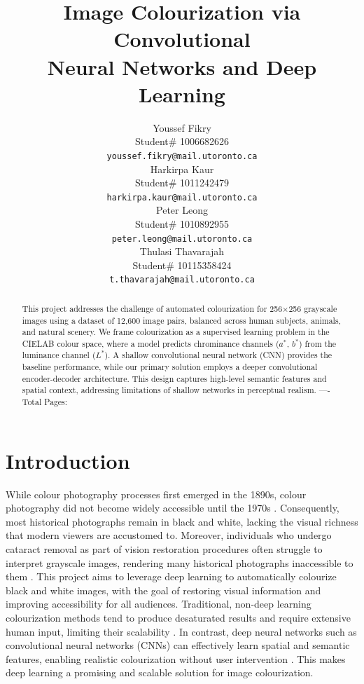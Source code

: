 \documentclass{article} %
\title{Image Colourization via Convolutional \\
Neural Networks and Deep Learning}
\author{Youssef Fikry  \\
Student\# 1006682626\\
\texttt{youssef.fikry@mail.utoronto.ca} \\
\And Harkirpa Kaur  \\
Student\# 1011242479 \\
\texttt{harkirpa.kaur@mail.utoronto.ca} \\
\AND
Peter Leong \\
Student\# 1010892955 \\
\texttt{peter.leong@mail.utoronto.ca} \\
\And
Thulasi Thavarajah \\
Student\# 10115358424 \\
\texttt{t.thavarajah@mail.utoronto.ca} \\
\AND
}
\begin{document}
\maketitle

\begin{abstract}
This project addresses the challenge of automated colourization for 256$\times$256 grayscale images using a dataset of 12,600 image pairs, balanced across human subjects, 
animals, and natural scenery. We frame colourization as a supervised learning problem in the CIELAB colour space, where a model predicts chrominance channels ($a^*$, $b^*$) 
from the luminance channel ($L^*$). A shallow convolutional neural network (CNN) provides the baseline performance, while our primary solution employs a deeper convolutional 
encoder-decoder architecture. This design captures high-level semantic features and spatial context, addressing limitations of shallow networks in perceptual realism.
----Total Pages: \pageref{last_page}
\end{abstract}


\section{Introduction}

While colour photography processes first emerged in the 1890s, colour photography did not become widely accessible until the 1970s \citep{scienceandmediamuseum2020}. 
Consequently, most historical photographs remain in black and white, lacking the visual richness that modern viewers are accustomed to. Moreover, individuals who undergo cataract 
removal as part of vision restoration procedures often struggle to interpret grayscale images, rendering many historical photographs inaccessible to them \citet{vogelsang2024impact}. 
This project aims to leverage deep learning to automatically colourize black and white images, with the goal of restoring visual information and improving accessibility for all audiences. 
Traditional, non-deep learning colourization methods tend to produce desaturated results and require extensive human input, limiting their scalability \citep{cheng2016deepcolorization}. 
In contrast, deep neural networks such as convolutional neural networks (CNNs) can effectively learn spatial and semantic features, enabling realistic colourization without user 
intervention \citep{zhang2016colorful}. This makes deep learning a promising and scalable solution for image colourization.
\end{document}
